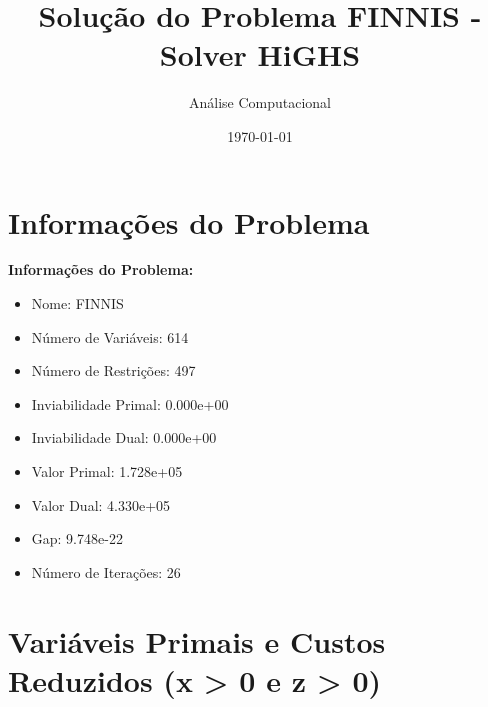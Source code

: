 \documentclass[12pt]{article}
\title{Solução do Problema FINNIS - Solver HiGHS}
\author{Análise Computacional}
\date{\today}
\begin{document}
\maketitle

\section{Informações do Problema}

\textbf{Informações do Problema:}
\begin{itemize}
\item Nome: FINNIS
\item Número de Variáveis: 614
\item Número de Restrições: 497
\item Inviabilidade Primal: 0.000e+00
\item Inviabilidade Dual: 0.000e+00
\item Valor Primal: 1.728e+05
\item Valor Dual: 4.330e+05
\item Gap: 9.748e-22
\item Número de Iterações: 26
\end{itemize}


\section{Variáveis Primais e Custos Reduzidos (x > 0 e z > 0)}
\end{document}
